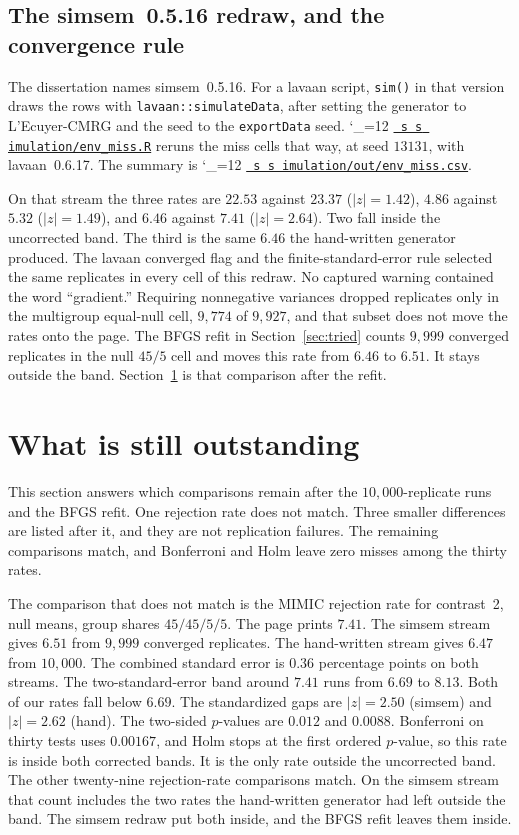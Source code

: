 \documentclass[11pt]{article}
\makeatletter
\newcommand{\proofbase}{https://github.com/alectionary/vibe-math/blob/master/formalization/latent-contrasts}
\def\latent@show#1{%
  \ifx\relax#1\else
    #1\allowbreak
    \expandafter\latent@show
  \fi}
\newcommand{\src}{\begingroup\catcode`\_=12 \latent@src}
\newcommand{\latent@src}[1]{%
  \edef\srcurl{\proofbase/#1}%
  \href{\srcurl}{\texttt{\latent@show#1\relax}}\endgroup}
\newcommand{\srcat}{\begingroup\catcode`\_=12 \latent@srcat}
\newcommand{\latent@srcat}[2]{%
  \edef\srcurl{\proofbase/#1\#L#2}%
  \href{\srcurl}{\texttt{\latent@show#1\relax}}\endgroup}
\makeatother
\begin{document}
\subsection{The simsem~0.5.16 redraw, and the convergence rule}

The dissertation names simsem~0.5.16. For a lavaan script,
\texttt{sim()} in that version draws the rows with
\texttt{lavaan::simulateData}, after setting the generator to
L'Ecuyer-CMRG and the seed to the \texttt{exportData} seed.
\srcat{simulation/env_miss.R}{126} reruns the miss cells that way, at seed
\(13131\), with lavaan~0.6.17. The summary is
\src{simulation/out/env_miss.csv}.

On that stream the three rates are \(22.53\) against \(23.37\)
(\(|z|=1.42\)), \(4.86\) against \(5.32\) (\(|z|=1.49\)), and \(6.46\)
against \(7.41\) (\(|z|=2.64\)). Two fall inside the uncorrected band.
The third is the same \(6.46\) the hand-written generator produced.
The lavaan converged flag and the finite-standard-error rule selected
the same replicates in every cell of this redraw. No captured warning
contained the word ``gradient.'' Requiring nonnegative variances
dropped replicates only in the multigroup equal-null cell, \(9{,}774\)
of \(9{,}927\), and that subset does not move the rates onto the page.
The BFGS refit in Section~\ref{sec:tried} counts \(9{,}999\) converged
replicates in the null \(45/5\) cell and moves this rate from \(6.46\)
to \(6.51\). It stays outside the band. Section~\ref{sec:open} is that
comparison after the refit.

\section{What is still outstanding}
\label{sec:open}

This section answers which comparisons remain after the
\(10{,}000\)-replicate runs and the BFGS refit.
One rejection rate does not match.
Three smaller differences are listed after it, and they are not
replication failures.
The remaining comparisons match, and Bonferroni and Holm leave zero
misses among the thirty rates.

The comparison that does not match is the MIMIC rejection rate for
contrast~2, null means, group shares \(45/45/5/5\).
The page prints \(7.41\).
The simsem stream gives \(6.51\) from \(9{,}999\) converged replicates.
The hand-written stream gives \(6.47\) from \(10{,}000\).
The combined standard error is \(0.36\) percentage points on both
streams. The two-standard-error band around \(7.41\) runs from \(6.69\)
to \(8.13\). Both of our rates fall below \(6.69\).
The standardized gaps are \(|z|=2.50\) (simsem) and \(|z|=2.62\) (hand).
The two-sided \(p\)-values are \(0.012\) and \(0.0088\).
Bonferroni on thirty tests uses \(0.00167\), and Holm stops at the
first ordered \(p\)-value, so this rate is inside both corrected bands.
It is the only rate outside the uncorrected band.
The other twenty-nine rejection-rate comparisons match.
On the simsem stream that count includes the two rates the
hand-written generator had left outside the band. The simsem redraw
put both inside, and the BFGS refit leaves them inside.
\end{document}
